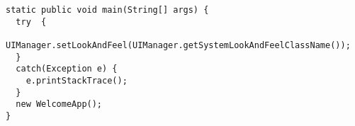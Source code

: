 \documentclass[]{final_report}
\begin{document}
\begin{verbatim}
static public void main(String[] args) {
  try  {
    UIManager.setLookAndFeel(UIManager.getSystemLookAndFeelClassName());
  }
  catch(Exception e) {
    e.printStackTrace();
  }
  new WelcomeApp();
} 
\end{verbatim}


\newpage
\nocite{*}
\printbibliography
\label{endpage}
\end{document}
